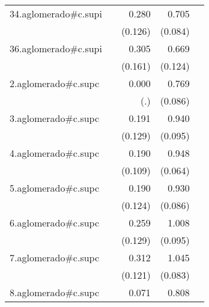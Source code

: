 {\begin{longtable}{l*{4}{D{.}{.}{-1}}}
\addlinespace
34.aglomerado#c.supi&                     &       0.280\sym{*}  &       0.705\sym{***}&                     \\
            &                     &     (0.126)         &     (0.084)         &                     \\
\addlinespace
36.aglomerado#c.supi&                     &       0.305         &       0.669\sym{***}&                     \\
            &                     &     (0.161)         &     (0.124)         &                     \\
\addlinespace
2.aglomerado#c.supc&                     &       0.000         &       0.769\sym{***}&                     \\
            &                     &         (.)         &     (0.086)         &                     \\
\addlinespace
3.aglomerado#c.supc&                     &       0.191         &       0.940\sym{***}&                     \\
            &                     &     (0.129)         &     (0.095)         &                     \\
\addlinespace
4.aglomerado#c.supc&                     &       0.190         &       0.948\sym{***}&                     \\
            &                     &     (0.109)         &     (0.064)         &                     \\
\addlinespace
5.aglomerado#c.supc&                     &       0.190         &       0.930\sym{***}&                     \\
            &                     &     (0.124)         &     (0.086)         &                     \\
\addlinespace
6.aglomerado#c.supc&                     &       0.259\sym{*}  &       1.008\sym{***}&                     \\
            &                     &     (0.129)         &     (0.095)         &                     \\
\addlinespace
7.aglomerado#c.supc&                     &       0.312\sym{*}  &       1.045\sym{***}&                     \\
            &                     &     (0.121)         &     (0.083)         &                     \\
\addlinespace
8.aglomerado#c.supc&                     &       0.071         &       0.808\sym{***}&                     \\

\end{longtable}}
